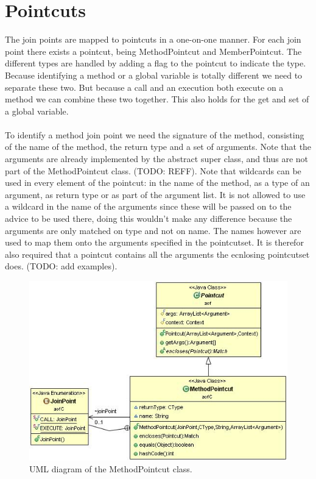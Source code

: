 \documentclass[a4paper]{report}
\begin{document}
\section{Pointcuts}
The join points are mapped to pointcuts in a one-on-one manner. For each join point there exists a pointcut, being MethodPointcut and MemberPointcut. The different types are handled by adding a flag to the pointcut to indicate the type. Because identifying a method or a global variable is totally different we need to separate these two. But because a call and an execution both execute on a method we can combine these two together. This also holds for the get and set of a global variable.\\
\\
To identify a method join point we need the signature of the method, consisting of the name of the method, the return type and a set of arguments. Note that the arguments are already implemented by the abstract super class, and thus are not part of the MethodPointcut class. (TODO: REFF). Note that wildcards can be used in every element of the pointcut: in the name of the method, as a type of an argument, as  return type or as part of the argument list. It is not allowed to use a wildcard in the name of the arguments since these will be passed on to the advice to be used there, doing this wouldn't make any difference because the arguments are only matched on type and not on name. The names however are used to map them onto the arguments specified in the pointcutset. It is therefor also required that a pointcut contains all the arguments the ecnlosing pointcutset does. (TODO: add examples).\\
\begin{figure}
\centering
\includegraphics[scale=0.7]{images/AOFC/MethodPointcut.jpg}
\caption{UML diagram of the MethodPointcut class.}
\label{fig:MethodPointcut}
\end{figure}
\end{document}
